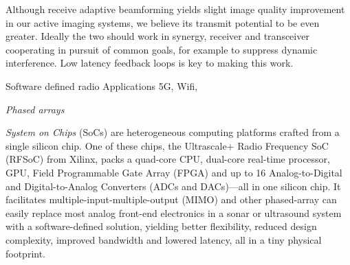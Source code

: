 Although receive adaptive beamforming yields slight image quality improvement in our active imaging systems, we believe its transmit potential to be even greater. Ideally the two should work in synergy, receiver and transceiver cooperating in pursuit of common goals, for example to suppress dynamic interference. Low latency feedback loops is key to making this work. 


Software defined radio 
Applications 5G, Wifi, 

\emph{Phased arrays} 


\emph{System on Chips} (SoCs) are heterogeneous computing platforms crafted from a single silicon chip. One of these chips, the Ultrascale+ Radio Frequency SoC (RFSoC) from Xilinx, packs a quad-core CPU, dual-core real-time processor, GPU, Field Programmable Gate Array (FPGA) and up to 16 Analog-to-Digital and Digital-to-Analog Converters (ADCs and DACs)---all in one silicon chip. It facilitates multiple-input-multiple-output (MIMO) and other phased-array  can easily replace most analog front-end electronics in a sonar or ultrasound system with a software-defined solution, yielding better flexibility, reduced design complexity, improved bandwidth and lowered latency, all in a tiny physical footprint.


